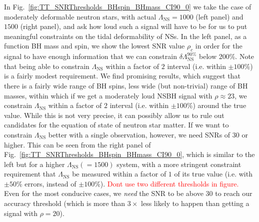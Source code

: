 \documentclass[aps,prd,amsmath,floats,floatfix, twocolumn,
superscriptaddress,nofootinbib,showpacs]{revtex4-1}
\newcommand{\red}{\textcolor{red}}
\newcommand{\lambdans}{\Lambda_\mathrm{NS}}
\newcommand{\dlambda}{\delta\lambdans^{90\%}}
\begin{document}
In Fig.~\ref{fig:TT_SNRThresholds_BHspin_BHmass_CI90_0} we take the case of
moderately deformable neutron stars, with actual $\lambdans = 1000$ (left 
panel) and $1500$ (right panel), and ask how loud such a signal will have
to be for us to put meaningful constraints on the tidal deformability of NSs.
In the left panel, as a function BH mass and spin, 
we show the lowest SNR value $\rho_c$ in order for the signal to have enough
information that we can constrain $\dlambda$ below $200\%$.
Note that being able to constrain $\lambdans$ within a factor of $2$ interval 
(i.e. within $\pm 100\%$) is a fairly modest requirement. We find promising 
results, which suggest that there is a fairly wide range of BH spins, less
wide (but non-trivial) range of BH masses, within
which if we get a moderately loud NSBH signal with $\rho\approx 23$, we constrain
$\lambdans$ within a factor of $2$ interval (i.e. within $\pm 100\%$) around
the true value. While this is not very precise, it can possibly allow us to
rule out candidates for the equation of state of neutron star matter.
% 
If we want to constrain $\lambdans$ better with a single observation, however,
we need SNRs of $30$ or higher. This can be seen from the right
panel of Fig.~\ref{fig:TT_SNRThresholds_BHspin_BHmass_CI90_0}, which is similar
to the left but for a higher $\lambdans (=1500)$ system, with a more stringent
constraint requirement that $\lambdans$ be measured within a factor of $1$ of 
its true value (i.e. with $\pm 50\%$ errors, instead of $\pm 100\%$).
\red{Dont use two different thresholds in figure.} Even for
the most conducive cases, we {\it need} the SNR to be above $30$ to reach our 
accuracy threshold (which is more than $3\times$ less likely to happen than
getting a signal with $\rho=20$).
\end{document}
